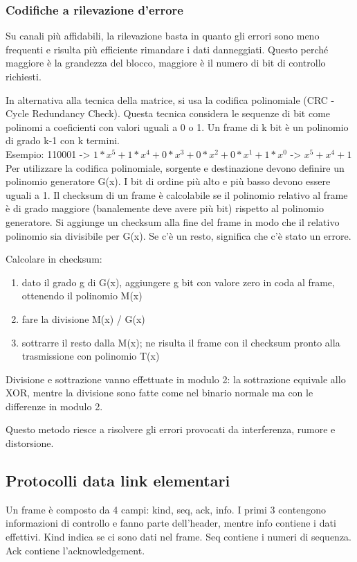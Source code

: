 \subsubsection{Codifiche a rilevazione d'errore}
Su canali più affidabili, la rilevazione basta in quanto gli errori sono meno frequenti e risulta più efficiente rimandare i dati danneggiati.
Questo perché maggiore è la grandezza del blocco, maggiore è il numero di bit di controllo richiesti.

In alternativa alla tecnica della matrice, si usa la codifica polinomiale (CRC - Cycle Redundancy Check).
Questa tecnica considera le sequenze di bit come polinomi a coeficienti con valori uguali a 0 o 1.
Un frame di k bit è un polinomio di grado k-1 con k termini.\\
Esempio: 110001 -> $1*x^5+1*x^4+0*x^3+0*x^2+0*x^1+1*x^0$ -> $x^5+x^4+1$\\

Per utilizzare la codifica polinomiale, sorgente e destinazione devono definire un polinomio generatore G(x).
I bit di ordine più alto e più basso devono essere uguali a 1.
Il checksum di un frame è calcolabile se il polinomio relativo al frame è di grado maggiore (banalemente deve avere più bit) rispetto al polinomio generatore.
Si aggiunge un checksum alla fine del frame in modo che il relativo polinomio sia divisibile per G(x).
Se c'è un resto, significa che c'è stato un errore.

Calcolare in checksum:
\begin{enumerate}
    \item dato il grado g di G(x), aggiungere g bit con valore zero in coda al frame, ottenendo il polinomio M(x)
    \item fare la divisione M(x) / G(x)
    \item sottrarre il resto dalla M(x); ne risulta il frame con il checksum pronto alla trasmissione con polinomio T(x)
\end{enumerate}
Divisione e sottrazione vanno effettuate in modulo 2: la sottrazione equivale allo XOR, mentre la divisione sono fatte come nel binario normale ma con le differenze in modulo 2.

Questo metodo riesce a risolvere gli errori provocati da interferenza, rumore e distorsione.

\subsection{Protocolli data link elementari} %
Un frame è composto da 4 campi: kind, seq, ack, info.
I primi 3 contengono informazioni di controllo e fanno parte dell'header, mentre info contiene i dati effettivi.
Kind indica se ci sono dati nel frame. Seq contiene i numeri di sequenza. Ack contiene l'acknowledgement.

